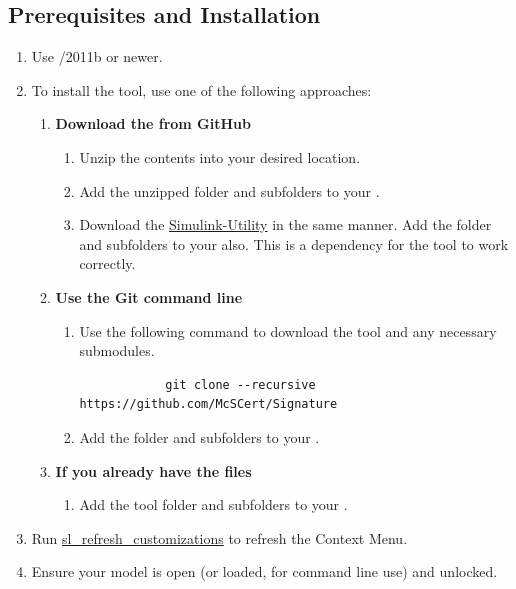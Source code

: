 \documentclass{article}
\begin{document}
\subsection{Prerequisites and Installation}

\begin{enumerate}
	\item Use \Matlab/\Simulink 2011b or newer.
	\item To install the tool, use one of the following approaches:
	\begin{enumerate}
		\item \textbf{Download the  from GitHub}
		\begin{enumerate} 
			\item Unzip the contents into your desired location. 
			\item Add the unzipped folder and subfolders to your \mpath. 
			\item Download the \href{https://github.com/McSCert/Simulink-Utility}{Simulink-Utility} in the same manner. Add the folder and subfolders to your \mpath also. This is a dependency for the tool to work correctly.
		\end{enumerate}
		\item \textbf{Use the Git command line}
			\begin{enumerate}
				\item Use the following command to download the tool and any necessary submodules. 
			\begin{verbatim}
			git clone --recursive https://github.com/McSCert/Signature
			\end{verbatim}
			\item Add the folder and subfolders to your \mpath. 
			\end{enumerate}
		\item \textbf{If you already have the files}
			\begin{enumerate}
						\item Add the tool folder and subfolders to your \mpath. 
			\end{enumerate}
	\end{enumerate}
	\item Run \href{https://www.mathworks.com/help/simulink/ug/registering-customizations.html}{sl\_refresh\_customizations} to refresh the Context Menu. 
	\item Ensure your model is open (or loaded, for command line use) and unlocked.
\end{enumerate}
\end{document}
